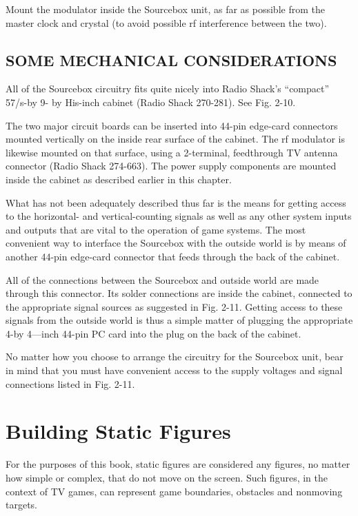 \documentclass[11pt]{book}              %
\begin{document}
Mount the modulator inside the Sourcebox unit, as far as possible from the master clock and crystal (to avoid possible rf interference between the two).

\section{SOME MECHANICAL CONSIDERATIONS}

All of the Sourcebox circuitry fits quite nicely into Radio Shack’s “compact” 57/s-by 9- by His-inch cabinet (Radio Shack 270-281). See Fig. 2-10.

The two major circuit boards can be inserted into 44-pin edge-card connectors mounted vertically on the inside rear surface of the cabinet. The rf modulator is likewise mounted on that surface, using a 2-terminal, feedthrough TV antenna connector (Radio Shack 274-663). The power supply components are mounted inside the cabinet as described earlier in this chapter.

What has not been adequately described thus far is the means for getting access to the horizontal- and vertical-counting signals as well as any other system inputs and outputs that are vital to the operation of game systems. The most convenient way to interface the Sourcebox with the outside world is by means of another 44-pin edge-card connector that feeds through the back of the cabinet.

All of the connections between the Sourcebox and outside world are made through this connector. Its solder connections are inside the cabinet, connected to the appropriate signal sources as suggested in Fig. 2-11. Getting access to these signals from the outside world is thus a simple matter of plugging the appropriate 4-by 4—inch 44-pin PC card into the plug on the back of the cabinet.

No matter how you choose to arrange the circuitry for the Sourcebox unit, bear in mind that you must have convenient access to the supply voltages and signal connections listed in Fig. 2-11.


\chapter{Building Static Figures}

For the purposes of this book, static figures are considered any figures, no matter how simple or complex, that do not move on the screen. Such figures, in the context of TV games, can represent game boundaries, obstacles and nonmoving targets.
\end{document}
